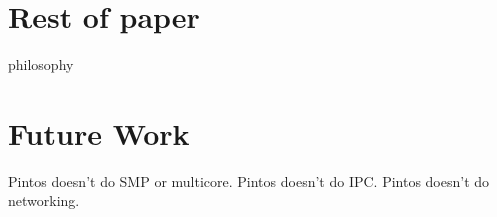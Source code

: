 \section{Rest of paper}

philosophy

\section{Future Work}

Pintos doesn't do SMP or multicore.
Pintos doesn't do IPC.
Pintos doesn't do networking.
